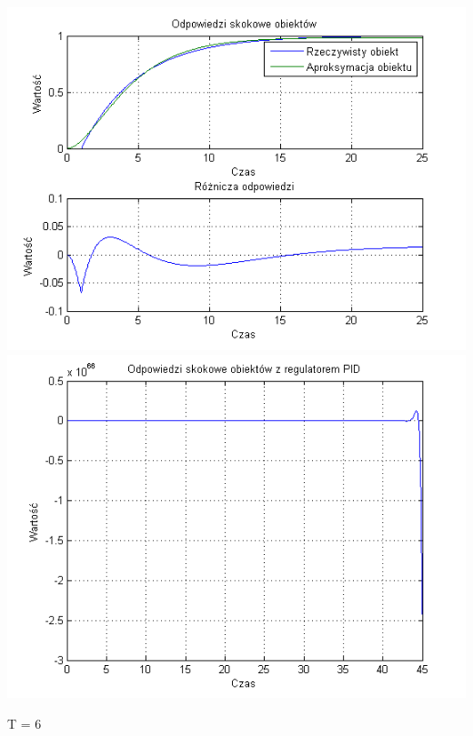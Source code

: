 \documentclass[10pt,a4paper]{article}
\begin{document}
\begin{center}
\includegraphics[scale=1]{images/dwa/skrypt_23.png}\\
\includegraphics[scale=1]{images/dwa/skrypt_24.png}\\
\end{center}
\newpage
T = 6
\end{document}
